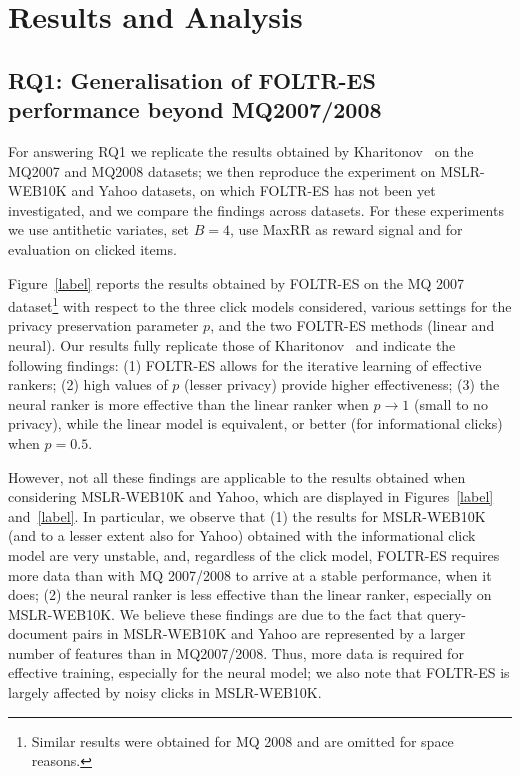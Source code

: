 \section{Results and Analysis}


\subsection{RQ1: Generalisation of FOLTR-ES performance beyond MQ2007/2008}
For answering RQ1 we replicate the results obtained by Kharitonov~\cite{kharitonov2019federated} on the MQ2007 and MQ2008 datasets; we then reproduce the experiment on MSLR-WEB10K and Yahoo datasets, on which FOLTR-ES has not been yet investigated, and we compare the findings across datasets. For these experiments we use antithetic variates, set $B = 4$, use MaxRR as reward signal and for evaluation on clicked items. 

Figure~\ref{label} reports the results obtained by FOLTR-ES on the MQ 2007 dataset\footnote{Similar results were obtained for MQ 2008 and are omitted for space reasons.} with respect to the three click models considered, various settings for the privacy preservation parameter $p$, and the two FOLTR-ES methods (linear and neural). Our results fully replicate those of Kharitonov~\cite{kharitonov2019federated} and indicate the following findings: (1) FOLTR-ES allows for the iterative learning of effective rankers; (2) high values of $p$ (lesser privacy) provide higher effectiveness; 
(3) the neural ranker is more effective than the linear ranker when $p \rightarrow 1$ (small to no privacy), while the linear model is equivalent, or better (for informational clicks) when $p=0.5$. 


However, not all these findings are applicable to the results obtained when considering MSLR-WEB10K and Yahoo, which are displayed in Figures~\ref{label} and~\ref{label}. In particular, we observe that (1) the results for MSLR-WEB10K (and to a lesser extent also for Yahoo) obtained with the informational click model are very unstable, and, regardless of the click model, FOLTR-ES requires more data than with MQ 2007/2008 to arrive at a stable performance, when it does; (2) the neural ranker is less effective than the linear ranker, especially on MSLR-WEB10K. We believe these findings are due to the fact that query-document pairs in MSLR-WEB10K and Yahoo are represented by a larger number of features than in MQ2007/2008. Thus, more data is required for effective training, especially for the neural model; we also note that FOLTR-ES is largely affected by noisy clicks in MSLR-WEB10K. 

